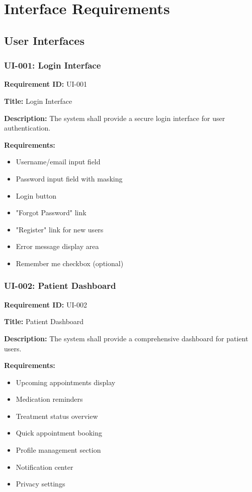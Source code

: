 \documentclass[12pt,a4paper]{article}
\begin{document}
\section{Interface Requirements}

\subsection{User Interfaces}

\subsubsection{UI-001: Login Interface}

\textbf{Requirement ID:} UI-001

\textbf{Title:} Login Interface

\textbf{Description:} The system shall provide a secure login interface for user authentication.

\textbf{Requirements:}
\begin{itemize}
    \item Username/email input field
    \item Password input field with masking
    \item Login button
    \item "Forgot Password" link
    \item "Register" link for new users
    \item Error message display area
    \item Remember me checkbox (optional)
\end{itemize}

\subsubsection{UI-002: Patient Dashboard}

\textbf{Requirement ID:} UI-002

\textbf{Title:} Patient Dashboard

\textbf{Description:} The system shall provide a comprehensive dashboard for patient users.

\textbf{Requirements:}
\begin{itemize}
    \item Upcoming appointments display
    \item Medication reminders
    \item Treatment status overview
    \item Quick appointment booking
    \item Profile management section
    \item Notification center
    \item Privacy settings
\end{itemize}
\end{document}
